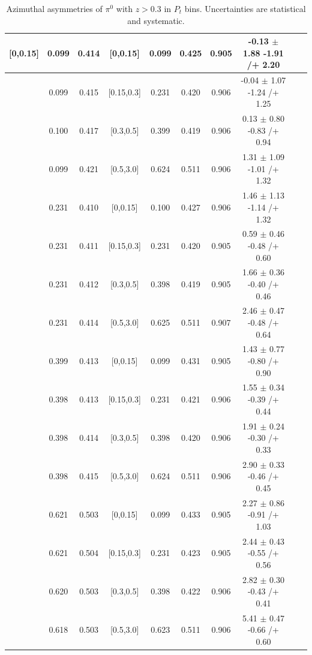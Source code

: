 \begin{table}[H]
\begin{tabular}{|c| c| c| c| c| c| c| c| c| c|}
[0,0.15]	&	0.099	&	0.414	&	[0,0.15]	&	0.099	&	0.425	&	0.905	&	-0.13	$\pm$ 	1.88	-1.91	/+	2.20	\\ \hline
[0,0.15]	&	0.099	&	0.415	&	[0.15,0.3]	&	0.231	&	0.420	&	0.906	&	-0.04	$\pm$ 	1.07	-1.24	/+	1.25	\\ \hline
[0,0.15]	&	0.100	&	0.417	&	[0.3,0.5]	&	0.399	&	0.419	&	0.906	&	0.13	$\pm$ 	0.80	-0.83	/+	0.94	\\ \hline
[0,0.15]	&	0.099	&	0.421	&	[0.5,3.0]	&	0.624	&	0.511	&	0.906	&	 	1.31	$\pm$ 	1.09	-1.01	/+	1.32	\\ \hline
[0.15,0.3]	&	0.231	&	0.410	&	[0,0.15]	&	0.100	&	0.427	&	0.906	&	1.46	$\pm$ 	1.13	-1.14	/+	1.32	\\ \hline
[0.15,0.3]	&	0.231	&	0.411	&	[0.15,0.3]	&	0.231	&	0.420	&	0.905	&		0.59	$\pm$ 	0.46	-0.48	/+	0.60	\\ \hline
[0.15,0.3]	&	0.231	&	0.412	&	[0.3,0.5]	&	0.398	&	0.419	&	0.905	&	1.66	$\pm$ 	0.36	-0.40	/+	0.46	\\ \hline
[0.15,0.3]	&	0.231	&	0.414	&	[0.5,3.0]	&	0.625	&	0.511	&	0.907	&	2.46	$\pm$ 	0.47	-0.48	/+	0.64	\\ \hline
[0.3,0.5]	&	0.399	&	0.413	&	[0,0.15]	&	0.099	&	0.431	&	0.905	&	1.43	$\pm$ 	0.77	-0.80	/+	0.90	\\ \hline
[0.3,0.5]	&	0.398	&	0.413	&	[0.15,0.3]	&	0.231	&	0.421	&	0.906	&	1.55	$\pm$ 	0.34	-0.39	/+	0.44	\\ \hline
[0.3,0.5]	&	0.398	&	0.414	&	[0.3,0.5]	&	0.398	&	0.420	&	0.906	&	1.91	$\pm$ 	0.24	-0.30	/+	0.33	\\ \hline
[0.3,0.5]	&	0.398	&	0.415	&	[0.5,3.0]	&	0.624	&	0.511	&	0.906	&	2.90	$\pm$ 	0.33	-0.46	/+	0.45	\\ \hline
[0.5,3.0]	&	0.621	&	0.503	&	[0,0.15]	&	0.099	&	0.433	&	0.905	&	2.27	$\pm$ 	0.86	-0.91	/+	1.03	\\ \hline
[0.5,3.0]	&	0.621	&	0.504	&	[0.15,0.3]	&	0.231	&	0.423	&	0.905	&	2.44	$\pm$ 	0.43	-0.55	/+	0.56	\\ \hline
[0.5,3.0]	&	0.620	&	0.503	&	[0.3,0.5]	&	0.398	&	0.422	&	0.906	&	2.82	$\pm$ 	0.30	-0.43	/+	0.41	\\ \hline
[0.5,3.0]	&	0.618	&	0.503	&	[0.5,3.0]	&	0.623	&	0.511	&	0.906	&	5.41	$\pm$ 	0.47	-0.66	/+	0.60	\\ \hline
\end{tabular}
\caption{Azimuthal asymmetries of $\pi^0$ with $z>0.3$ in $P_t$ bins. Uncertainties are statistical and systematic.}
\label{tab:finaletaptbin2}
\end{table}

